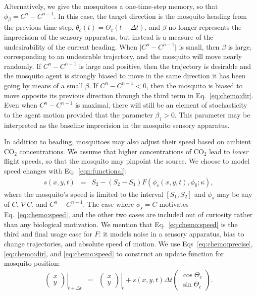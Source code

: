 \documentclass[12pt]{article}
\newif\ifcommentsw
\newcommand{\comment}[1]{\ifcommentsw  $\blacktriangleright$\ \textbf{#1}\ $\blacktriangleleft$ \fi}
\begin{document}
	Alternatively, we give the mosquitoes a one-time-step memory, so that $\phi_\beta = C^n - C^{n-1}$. In this case, the target direction is the mosquito heading from the previous time step, $\theta_c(t) = \Theta_c(t-\Delta t)$, and $\beta$ no longer represents the imprecision of the sensory apparatus, but instead is a measure of the undesirability of the current heading. When $\lvert C^n - C^{n-1}\rvert$ is small, then $\beta$ is large, corresponding to an undesirable trajectory, and the mosquito will move nearly randomly. If $C^n - C^{n-1}$ is large and positive, then the trajectory is desirable and the mosquito agent is strongly biased to move in the same direction it has been going by means of a small $\beta$. If $C^n - C^{n-1} < 0$, then the mosquito is biased to move opposite its previous direction through the third term in Eq.~\eqref{eq:chemo:dir}. Even when $C^n - C^{n-1}$ is maximal, there will still be an element of stochasticity to the agent motion provided that the parameter $\beta_1 > 0$. This parameter may be interpreted as the baseline imprecision in the mosquito sensory apparatus. 
	
	In addition to heading, mosquitoes may also adjust their speed based on ambient CO$_2$ concentrations. We assume that higher concentrations of CO$_2$ lead to \emph{lower} flight speeds, so that the mosquito may pinpoint the source. We choose to model speed changes with Eq.~\eqref{eqn:functional}: \comment{Bree: Rewrite using new rule.}
	\begin{eqnarray}
		s(x,y,t) &=&   S_2 - (S_2 - S_1)F(\phi_s(x,y,t), \phi_0; \kappa), \label{eq:chemo:speed}
	\end{eqnarray}
	where the mosquito's speed is limited to the interval $[S_1,S_2]$ and $\phi_s$ may be any of $C$, $\nabla C$, and $C^n - C^{n-1}$. The case where $\phi_s = C$ motivates Eq.~\eqref{eq:chemo:speed}, and the other two cases are included out of curiosity rather than any biological motivation. We mention that Eq.~\eqref{eq:chemo:speed} is the third and final usage case for $F$: it models noise in a sensory apparatus, bias to change trajectories, and absolute speed of motion. We use Eqs~\eqref{eq:chemo:precise}, \eqref{eq:chemo:dir}, and \eqref{eq:chemo:speed} to construct an update function for mosquito position:
	\begin{eqnarray}
		\left.\begin{pmatrix} x \\ y \end{pmatrix}\right\vert_{t+\Delta t} &=& \left.\begin{pmatrix} x \\ y \end{pmatrix}\right\vert_{t} + s(x,y,t) \Delta t \begin{pmatrix}  \cos\Theta_c \\ \sin\Theta_c \end{pmatrix}. \label{eq:chemo:motion}
	\end{eqnarray}
	
\end{document}
